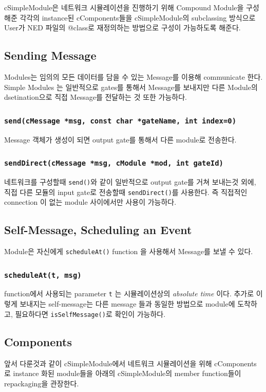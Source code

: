 cSimpleModule은 네트워크 시뮬레이션을 진행하기 위해 Compound Module을 구성해준 각각의 instance된 cComponents들을 cSimpleModule의 subclassing 방식으로 User가 NED 파일의 @class로 재정의하는 방법으로 구성이 가능하도록 해준다.
\subsection*{Sending Message}
Modules는 임의의 모든 데이터를 담을 수 있는 Message를 이용해 communicate 한다. Simple Modules 는 일반적으로 gates를 통해서 Message를 보내지만  다른 Module의 dsetination으로 직접 Message를 전달하는 것  또한 가능하다. 
    \subsubsection*{\texttt{send(cMessage *msg, const char *gateName, int index=0)}}
    Message 객체가 생성이 되면 output gate를 통해서 다른 module로 전송한다. 
\vspace{-2mm}
    \subsubsection*{\texttt{sendDirect(cMessage *msg, cModule *mod, int gateId)}}
    네트워크를 구성할때 \texttt{send()}와 같이 일반적으로 output gate를 거쳐 보내는것 외에, 직접 다른 모듈의 input gate로 전송할때 \texttt{sendDirect()}를 사용한다. 즉 직접적인 connection 이 없는 module 사이에서만 사용이 가능하다.
\vspace{-2mm}
\subsection*{Self-Message, Scheduling an Event}
Module은 자신에게 \texttt{scheduleAt()} function 을 사용해서 Message를 보낼 수 있다.
    \subsubsection*{\texttt{scheduleAt(t, msg)}}
    function에서 사용되는 parameter \texttt{t} 는 시뮬레이션상의 \textit{absolute time} 이다. 추가로 이렇게 보내지는 self-message는 다른 message 들과 동일한 방법으로 module에 도착하고, 필요하다면 \texttt{isSelfMessage()}로 확인이 가능하다.
\vspace{-2mm}
\subsection*{Components}
앞서 다룬것과 같이 cSimpleModule에서 네트워크 시뮬레이션을 위해 cComponents 로 instance 화된 module들을 아래의 cSimpleModule의 member function들이 repackaging을 관장한다. 
